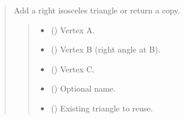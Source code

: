 \documentclass[letterpaper,10pt,english]{sphinxmanual}
\begin{document}
\begin{quote}
\begin{fulllineitems}
\begin{fulllineitems}
\label{\detokenize{pygeox:pygeox.add_objects.AddNamespace.right_isosceles_triangle}}
\pysigstartsignatures
\pysiglinewithargsret
{}
{\sphinxparamcomma {}\sphinxparamcomma {}\sphinxparamcomma {}\sphinxparamcomma {}}
{}
\pysigstopsignatures
\sphinxAtStartPar
Add a right isosceles triangle or return a copy.
\begin{quote}\begin{description}
\begin{itemize}
\item {} 
\sphinxAtStartPar
{} (\sphinxstyleliteralemphasis{\sphinxupquote{ | }}) \textendash{} Vertex A.

\item {} 
\sphinxAtStartPar
{} (\sphinxstyleliteralemphasis{\sphinxupquote{ | }}) \textendash{} Vertex B (right angle at B).

\item {} 
\sphinxAtStartPar
{} (\sphinxstyleliteralemphasis{\sphinxupquote{ | }}) \textendash{} Vertex C.

\item {} 
\sphinxAtStartPar
{} (\sphinxstyleliteralemphasis{\sphinxupquote{ | }}) \textendash{} Optional name.

\item {} 
\sphinxAtStartPar
{} (\sphinxstyleliteralemphasis{\sphinxupquote{ | }}) \textendash{} Existing triangle to reuse.


\end{itemize}
\end{description}
\end{quote}
\end{fulllineitems}
\end{fulllineitems}
\end{quote}
\end{document}
